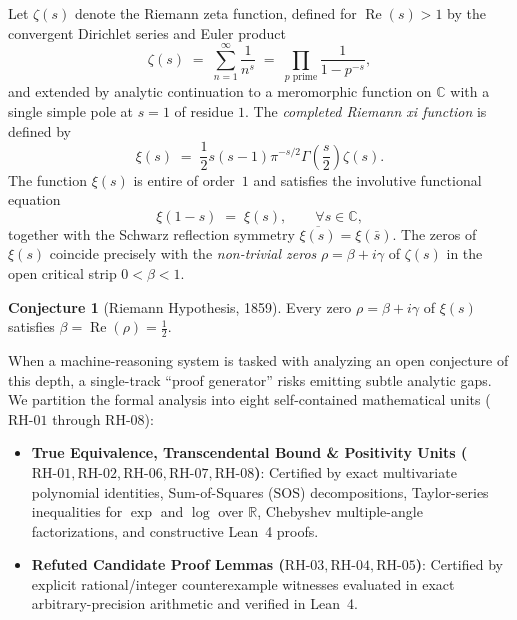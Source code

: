 \documentclass[11pt,a4paper]{article}
\theoremstyle{plain}
\theoremstyle{definition}
\newtheorem{conjecture}[theorem]{Conjecture}
\theoremstyle{remark}
\newcommand{\C}{\mathbb{C}}
\newcommand{\R}{\mathbb{R}}
\DeclareMathOperator{\RePart}{Re}
\begin{document}
Let $\zeta(s)$ denote the Riemann zeta function, defined for $\RePart(s) > 1$ by the convergent Dirichlet series and Euler product
\begin{equation}
  \zeta(s) \;=\; \sum_{n=1}^{\infty} \frac{1}{n^s} \;=\; \prod_{p \text{ prime}} \frac{1}{1 - p^{-s}},
\end{equation}
and extended by analytic continuation to a meromorphic function on $\C$ with a single simple pole at $s = 1$ of residue $1$. The \emph{completed Riemann xi function} is defined by
\begin{equation}
  \xi(s) \;=\; \frac{1}{2} s(s-1)\pi^{-s/2}\Gamma\!\left(\frac{s}{2}\right)\zeta(s).
\end{equation}
The function $\xi(s)$ is entire of order~$1$ and satisfies the involutive functional equation
\begin{equation}\label{eq:functional-eq}
  \xi(1 - s) \;=\; \xi(s), \qquad \forall s \in \C,
\end{equation}
together with the Schwarz reflection symmetry $\overline{\xi(s)} = \xi(\bar{s})$. The zeros of $\xi(s)$ coincide precisely with the \emph{non-trivial zeros} $\rho = \beta + i\gamma$ of $\zeta(s)$ in the open critical strip $0 < \beta < 1$.

\begin{conjecture}[Riemann Hypothesis, 1859]
Every zero $\rho = \beta + i\gamma$ of $\xi(s)$ satisfies $\beta = \RePart(\rho) = \frac{1}{2}$.
\end{conjecture}

When a machine-reasoning system is tasked with analyzing an open conjecture of this depth, a single-track ``proof generator'' risks emitting subtle analytic gaps. We partition the formal analysis into eight self-contained mathematical units ($\mathrm{RH\text{-}01}$ through $\mathrm{RH\text{-}08}$):
\begin{itemize}
  \item \textbf{True Equivalence, Transcendental Bound \& Positivity Units ($\mathrm{RH\text{-}01}, \mathrm{RH\text{-}02}, \mathrm{RH\text{-}06}, \mathrm{RH\text{-}07}, \mathrm{RH\text{-}08}$)}: Certified by exact multivariate polynomial identities, Sum-of-Squares ($\mathrm{SOS}$) decompositions, Taylor-series inequalities for $\exp$ and $\log$ over $\R$, Chebyshev multiple-angle factorizations, and constructive Lean~4 proofs.
  \item \textbf{Refuted Candidate Proof Lemmas ($\mathrm{RH\text{-}03}, \mathrm{RH\text{-}04}, \mathrm{RH\text{-}05}$)}: Certified by explicit rational/integer counterexample witnesses evaluated in exact arbitrary-precision arithmetic and verified in Lean~4.
\end{itemize}
\end{document}
